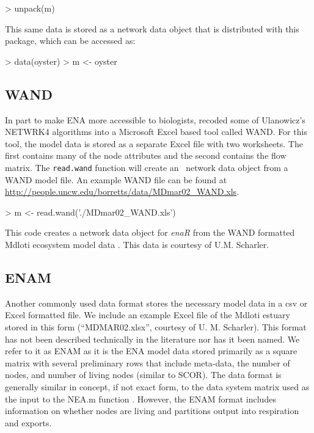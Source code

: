 \documentclass[article]{jss}
\begin{document}
\begin{Schunk}
\begin{Sinput}
> unpack(m)
\end{Sinput}
\end{Schunk}

This same data is stored as a network data object that is distributed
with this package, which can be accessed as:
\begin{Schunk}
\begin{Sinput}
> data(oyster)
> m <- oyster
\end{Sinput}
\end{Schunk}

\subsection*{WAND}
In part to make ENA more accessible to biologists,
\citet{allesina04_wand} recoded some of Ulanowicz's NETWRK4 algorithms
into a Microsoft Excel based tool called WAND.  For this tool, the
model data is stored as a separate Excel file with two worksheets.
The first contains many of the node attributes and the second contains the
flow matrix.  The \texttt{read.wand} function will create an \R\
network data object from a WAND model file. An example WAND file can
be found at \url{http://people.uncw.edu/borretts/data/MDmar02_WAND.xls}.

\begin{Schunk}
\begin{Sinput}
>   m <- read.wand('./MDmar02_WAND.xls')
\end{Sinput}
\end{Schunk}

This code creates a network data object for \textit{enaR} from the WAND
formatted Mdloti ecosystem model data
\citep{scharler2012ecosystem}. This data is courtesy of U.M. Scharler.

\subsection*{ENAM}

Another commonly used data format stores the necessary model data in a
csv or Excel formatted file.  We include an example Excel file of the
Mdloti estuary stored in this form (``MDMAR02.xlsx'', courtesy
of U. M. Scharler).  This format has not been described technically in
the literature nor has it been named.  We refer to it as ENAM as it is
the ENA model data stored primarily as a square matrix with several
preliminary rows that include meta-data, the number of nodes, and
number of living nodes (similar to SCOR).  The data format is
generally similar in concept, if not exact form, to the data system
matrix used as the input to the NEA.m function \citep{fath06}.
However, the ENAM format includes information on whether nodes are
living and partitions output into respiration and exports.
\end{document}
